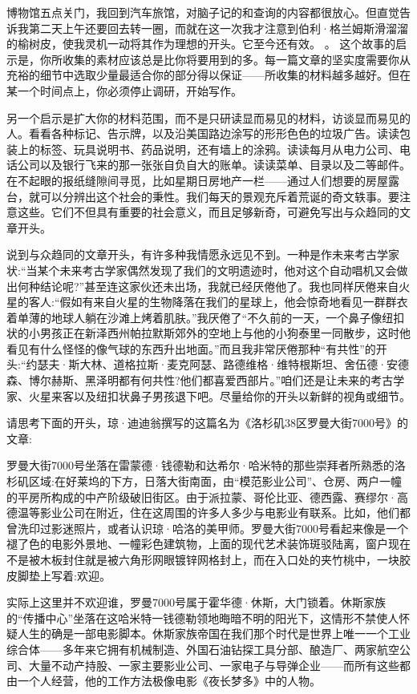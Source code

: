博物馆五点关门，我回到汽车旅馆，对脑子记的和查询的内容都很放心。但直觉告诉我第二天上午还要回去转一圈，而就在这一次我才注意到伯利·格兰姆斯滑溜溜的榆树皮，使我灵机一动将其作为理想的开头。它至今还有效。
。
这个故事的启示是，你所收集的素材应该总是比你将要用到的多。每一篇文章的坚实度需要你从充裕的细节中选取少量最适合你的部分得以保证——所收集的材料越多越好。但在某一个时间点上，你必须停止调研，开始写作。

另一个启示是扩大你的材料范围，而不是只研读显而易见的材料，访谈显而易见的人。看看各种标记、告示牌，以及沿美国路边涂写的形形色色的垃圾广告。读读包装上的标签、玩具说明书、药品说明，还有墙上的涂鸦。读读每月从电力公司、电话公司以及银行飞来的那一张张自负自大的账单。读读菜单、目录以及二等邮件。在不起眼的报纸缝隙间寻觅，比如星期日房地产一栏——通过人们想要的房屋露台，就可以分辨出这个社会的秉性。我们每天的景观充斥着荒诞的奇文轶事。要注意这些。它们不但具有重要的社会意义，而且足够新奇，可避免写出与众趋同的文章开头。

说到与众趋同的文章开头，有许多种我情愿永远见不到。一种是作未来考古学家状:“当某个未来考古学家偶然发现了我们的文明遗迹时，他对这个自动唱机又会做出何种结论呢?”甚至连这家伙还未出场，我就已经厌倦他了。我也同样厌倦来自火星的客人:“假如有来自火星的生物降落在我们的星球上，他会惊奇地看见一群群衣着单薄的地球人躺在沙滩上烤着肌肤。”我厌倦了“不久前的一天，一个鼻子像纽扣状的小男孩正在新泽西州帕拉默斯郊外的空地上与他的小狗泰里一同散步，这时他看见有什么怪怪的像气球的东西升出地面。”而且我非常厌倦那种“有共性”的开头:“约瑟夫·斯大林、道格拉斯·麦克阿瑟、路德维格·维特根斯坦、舍伍德·安德森、博尔赫斯、黑泽明都有何共性?他们都喜爱西部片。”咱们还是让未来的考古学家、火星来客以及纽扣状鼻子男孩退下吧。尽量给你的开头以新鲜的视角或细节。

请思考下面的开头，琼·迪迪翁撰写的这篇名为《洛杉矶38区罗曼大街7000号》的文章:

罗曼大街7000号坐落在雷蒙德·钱德勒和达希尔·哈米特的那些崇拜者所熟悉的洛杉矶区域:在好莱坞的下方，日落大街南面，由“模范影业公司”、仓房、两户一幢的平房所构成的中产阶级破旧街区。由于派拉蒙、哥伦比亚、德西露、赛缪尔·高德温等影业公司在附近，住在这周围的许多人多少与电影业有联系。比如，他们都曾洗印过影迷照片，或者认识琼·哈洛的美甲师。罗曼大街7000号看起来像是一个褪了色的电影外景地、一幢彩色建筑物，上面的现代艺术装饰斑驳陆离，窗户现在不是被木板封住就是被六角形网眼镀锌网格封上，而在入口处的夹竹桃中，一块胶皮脚垫上写着:欢迎。

实际上这里并不欢迎谁，罗曼7000号属于霍华德·休斯，大门锁着。休斯家族的“传播中心”坐落在这哈米特一钱德勒领地晦暗不明的阳光下，这情形不禁使人怀疑人生的确是一部电影脚本。休斯家族帝国在我们那个时代是世界上唯一一个工业综合体——多年来它拥有机械制造、外国石油钻探工具分部、酿造厂、两家航空公司、大量不动产持股、一家主要影业公司、一家电子与导弹企业——而所有这些都由一个人经营，他的工作方法极像电影《夜长梦多》中的人物。

